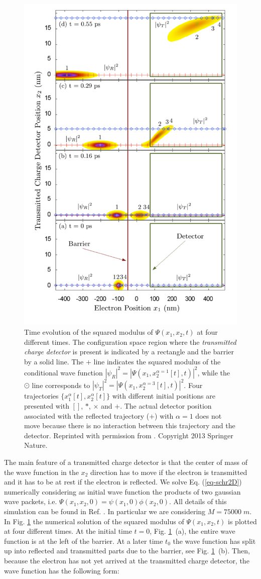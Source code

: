 \documentclass[nofootinbib, secnumarabic, amsmath, nobibnotes,11pt,aps,pra, floatfix]{revtex4-1}
\newcommand{\fref}[1]{Fig. \ref{#1}}
\newcommand{\eref}[1]{Eq. (\ref{#1})}
\begin{document}
\begin{figure}[p]
\centering
\includegraphics[width=0.57\columnwidth]{F1_12.pdf}
\caption{Time evolution of the squared modulus of $\Psi(x_1,x_2,t)$ at four different times. The configuration space region where the \emph{transmitted charge detector} is present is indicated by a rectangle and the barrier by a solid line. The $+$ line indicates the squared modulus of the conditional wave function $|\psi_R|^2=|\Psi(x_1,x_2^{\alpha=1}[t],t)|^2$, while the  $\odot$ line corresponds to $|\psi_T|^2=|\Psi(x_1,x_2^{\alpha=3}[t],t)|^2$. Four trajectories $\{x_1^\alpha[t],x_2^\alpha[t]\}$ with different initial positions are presented with $[]$, $*$, $\times$ and $+$. The actual detector position associated with the reflected trajectory ($+$) with $\alpha=1$ does not move because there is no interaction between this trajectory and the detector. Reprinted with permission from \cite{om.albareda}. Copyright 2013 Springer Nature.}
\label{conditional wave function-figure1}
\end{figure}

The main feature of a transmitted charge detector is that the center of mass of the wave function in the $x_2$ direction has to move if the
electron is transmitted and it has to be at rest if the electron is reflected.  We solve \eref{eq-schr2D} numerically considering as initial wave function the products of two gaussian wave packets, i.e. $\Psi(x_1,x_2,0) = \psi(x_1,0)\phi(x_2,0)$. All details of this simulation can be found in Ref. \cite{om.albareda,om.2marian}. In particular we are considering $M=75000 \; m$. In \fref{conditional wave function-figure1} the numerical solution of the squared modulus of $\Psi(x_1,x_2,t)$ is plotted at four different times. At the initial time $t = 0$,  \fref{conditional wave function-figure1}~(a),  the entire wave function is at the left of the barrier.  At a later time $t_0$ the wave function has split up into reflected and transmitted parts due to the barrier, see \fref{conditional wave function-figure1}~(b).  Then, because the electron has not yet arrived at the transmitted charge detector, the wave function has the following form: 
\end{document}
